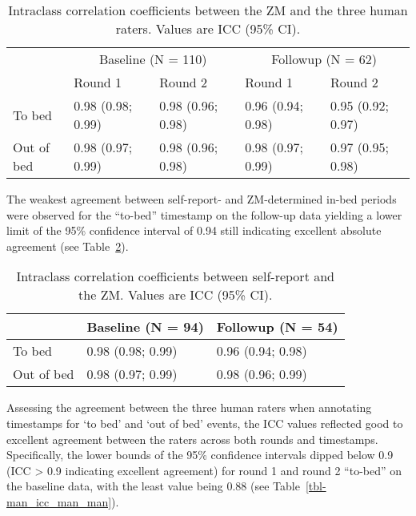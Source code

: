 \documentclass[
  10pt,
]{scrbook}
\begin{document}
\begingroup

\footnotesize

\hypertarget{tbl-man_icc_zm_man}{}
\begin{longtable}{lllll}
\caption{\label{tbl-man_icc_zm_man}Intraclass correlation coefficients between the ZM and the three human
raters. Values are ICC (95\% CI). }\tabularnewline

\toprule
 & \multicolumn{2}{c}{Baseline (N = 110)} & \multicolumn{2}{c}{Followup (N = 62)} \\ 
\cmidrule(lr){2-3} \cmidrule(lr){4-5}
 & Round 1 & Round 2 & Round 1 & Round 2 \\ 
\midrule
To bed & 0.98 (0.98; 0.99) & 0.98 (0.96; 0.98) & 0.96 (0.94; 0.98) & 0.95 (0.92; 0.97) \\ 
Out of bed & 0.98 (0.97; 0.99) & 0.98 (0.96; 0.98) & 0.98 (0.97; 0.99) & 0.97 (0.95; 0.98) \\ 
\bottomrule
\end{longtable}

\endgroup

The weakest agreement between self-report- and ZM-determined in-bed
periods were observed for the ``to-bed'' timestamp on the follow-up data
yielding a lower limit of the 95\% confidence interval of 0.94 still
indicating excellent absolute agreement (see
Table~\ref{tbl-man_icc_zm_self}).

\begingroup

\footnotesize

\hypertarget{tbl-man_icc_zm_self}{}
\begin{longtable}{lll}
\caption{\label{tbl-man_icc_zm_self}Intraclass correlation coefficients between self-report and the ZM.
Values are ICC (95\% CI). }\tabularnewline

\toprule
 & Baseline (N = 94) & Followup (N = 54) \\ 
\midrule
To bed & 0.98 (0.98; 0.99) & 0.96 (0.94; 0.98) \\ 
Out of bed & 0.98 (0.97; 0.99) & 0.98 (0.96; 0.99) \\ 
\bottomrule
\end{longtable}

\endgroup

Assessing the agreement between the three human raters when annotating
timestamps for `to bed' and `out of bed' events, the ICC values
reflected good to excellent agreement between the raters across both
rounds and timestamps. Specifically, the lower bounds of the 95\%
confidence intervals dipped below 0.9 (ICC \textgreater{} 0.9 indicating
excellent agreement) for round 1 and round 2 ``to-bed'' on the baseline
data, with the least value being 0.88 (see
Table~\ref{tbl-man_icc_man_man}).
\end{document}
